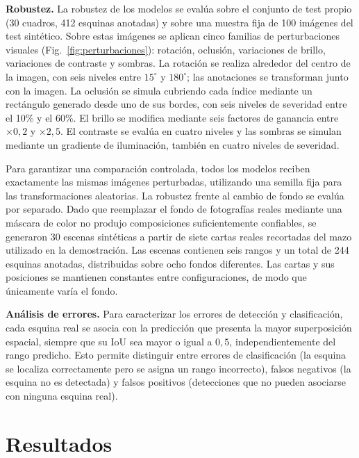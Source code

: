 \documentclass[conference,a4paper]{IEEEtran}
\begin{document}
\textbf{Robustez.} La robustez de los modelos se evalúa sobre el conjunto de test propio (30 cuadros, 412 esquinas anotadas) y sobre una muestra fija de 100 imágenes del test sintético. Sobre estas imágenes se aplican cinco familias de perturbaciones visuales (Fig.~\ref{fig:perturbaciones}): rotación, oclusión, variaciones de brillo, variaciones de contraste y sombras. La rotación se realiza alrededor del centro de la imagen, con seis niveles entre $15^\circ$ y $180^\circ$; las anotaciones se transforman junto con la imagen. La oclusión se simula cubriendo cada índice mediante un rectángulo generado desde uno de sus bordes, con seis niveles de severidad entre el 10\% y el 60\%. El brillo se modifica mediante seis factores de ganancia entre $\times 0{,}2$ y $\times 2{,}5$. El contraste se evalúa en cuatro niveles y las sombras se simulan mediante un gradiente de iluminación, también en cuatro niveles de severidad.

Para garantizar una comparación controlada, todos los modelos reciben exactamente las mismas imágenes perturbadas, utilizando una semilla fija para las transformaciones aleatorias. La robustez frente al cambio de fondo se evalúa por separado. Dado que reemplazar el fondo de fotografías reales mediante una máscara de color no produjo composiciones suficientemente confiables, se generaron 30 escenas sintéticas a partir de siete cartas reales recortadas del mazo utilizado en la demostración. Las escenas contienen seis rangos y un total de 244 esquinas anotadas, distribuidas sobre ocho fondos diferentes. Las cartas y sus posiciones se mantienen constantes entre configuraciones, de modo que únicamente varía el fondo.

\textbf{Análisis de errores.} Para caracterizar los errores de detección y clasificación, cada esquina real se asocia con la predicción que presenta la mayor superposición espacial, siempre que su IoU sea mayor o igual a $0{,}5$, independientemente del rango predicho. Esto permite distinguir entre errores de clasificación (la esquina se localiza correctamente pero se asigna un rango incorrecto), falsos negativos (la esquina no es detectada) y falsos positivos (detecciones que no pueden asociarse con ninguna esquina real).



\section{Resultados}
\end{document}
